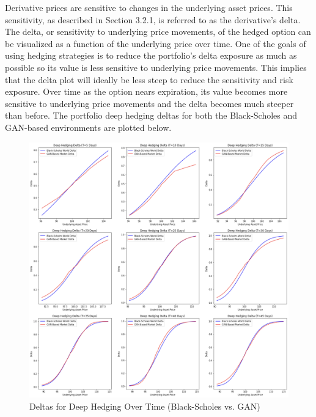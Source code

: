 \noindent Derivative prices are sensitive to changes in the underlying asset prices. This sensitivity, as described in Section 3.2.1, is referred to as the derivative's delta. The delta, or sensitivity to underlying price movements, of the hedged option can be visualized as a function of the underlying price over time. One of the goals of using hedging strategies is to reduce the portfolio's delta exposure as much as possible so its value is less sensitive to underlying price movements. This implies that the delta plot will ideally be less steep to reduce the sensitivity and risk exposure. Over time as the option nears expiration, its value becomes more sensitive to underlying price movements and the delta becomes much steeper than before. The portfolio deep hedging deltas for both the Black-Scholes and GAN-based environments are plotted below.
\begin{figure}[h]
\centering
\includegraphics[width=14cm]{templates/assets/drl/delta.png}
\caption{Deltas for Deep Hedging Over Time (Black-Scholes vs. GAN)}
\end{figure}


